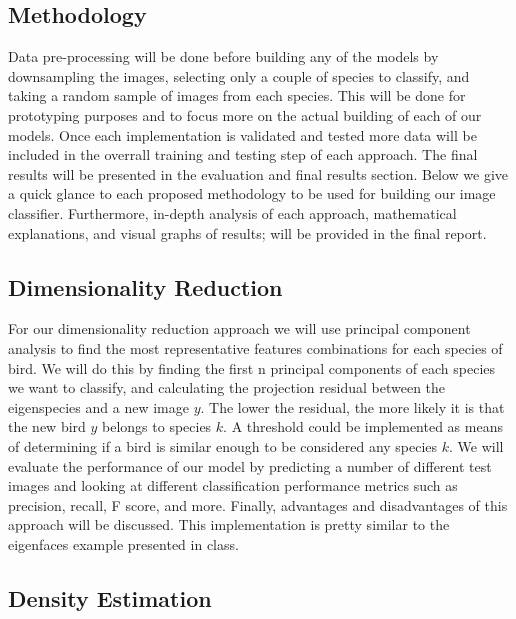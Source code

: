 \documentclass[11pt]{article}
\begin{document}
\begin{singlespace}
\section{Methodology}

Data pre-processing will be done before building any of the models by downsampling the images, selecting only a couple of species to classify, and taking a random sample of images from each species. This will be done for prototyping purposes and to focus more on the actual building of each of our models. Once each implementation is validated and tested more data will be included in the overrall training and testing step of each approach. The final results will be presented in the evaluation and final results section. Below we give a quick glance to each proposed methodology to be used for building our image classifier. Furthermore, in-depth analysis of each approach, mathematical explanations, and visual graphs of results; will be provided in the final report. 

\subsection{Dimensionality Reduction}
For our dimensionality reduction approach we will use principal component analysis to find the most representative features combinations for each species of bird.   We will do this by finding the first n principal components of each species we want to classify, and calculating the projection residual between the eigenspecies and a new image $y$. The lower the residual, the more likely it is that the new bird $y$ belongs to species $k$. A threshold could be implemented as means of determining if a bird is similar enough to be considered any species $k$. We will evaluate the performance of our model by predicting a number of different test images and looking at different classification performance metrics such as precision, recall, F score, and more. Finally, advantages and disadvantages of this approach will be discussed. This implementation is pretty similar to the eigenfaces example presented in class. 

\subsection{Density Estimation}


\end{singlespace}
\end{document}
